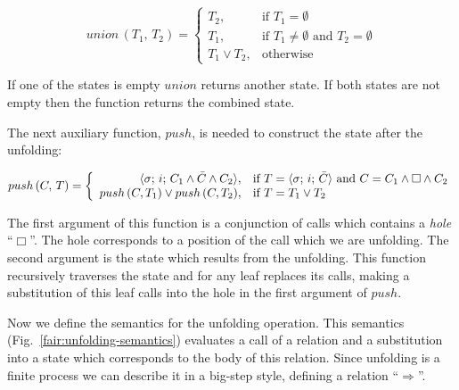 \[
union\,(T_1,\, T_2) =
\left\{
\begin{array}{rl}
T_2, & \mbox{if } T_1 = \emptyset \\
T_1, & \mbox{if } T_1 \not= \emptyset \mbox{ and } T_2 = \emptyset \\
T_1 \lor T_2, & \mbox{otherwise}
\end{array}
\right.
\]


If one of the states is empty $union$ returns another state. If both states are not empty then the function returns the combined state.

The next auxiliary function, $push$, is needed to construct the state after the unfolding:

\[
push\,(C,\, T) =
\left\{
\begin{array}{rl}
\langle \sigma;\, i;\, C_1 \land \bar{C} \land C_2 \rangle, & \mbox{if } T = \langle \sigma;\, i;\, \bar{C} \rangle \mbox{ and } C = C_1 \land \Box \land C_2 \\
push\,(C, T_1) \lor push\,(C, T_2), & \mbox{if } T = T_1 \lor T_2
\end{array}
\right.
\]


The first argument of this function is a conjunction of calls which contains a \emph{hole} ``$\Box$''. The hole corresponds to a position of the call which we are unfolding. 
The second argument is the state which results from the unfolding. This function recursively traverses the state and for any leaf replaces its calls, making a substitution of
this leaf calls into the hole in the first argument of $push$.

Now we define the semantics for the unfolding operation. This semantics (Fig.~\ref{fair:unfolding-semantics}) evaluates a call of a relation and a substitution into a state which
corresponds to the body of this relation. Since unfolding is a finite process we can describe it in a big-step style, defining a relation ``$\Rightarrow$''.

